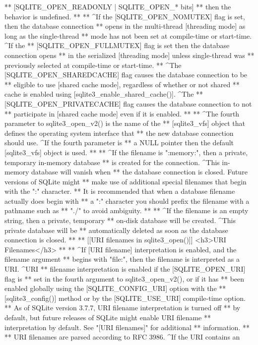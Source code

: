 \begin{Codex}[label=sqlite3.h,numbers=left]
{** [SQLITE_OPEN_READONLY | SQLITE_OPEN_* bits]
** then the behavior is undefined.
**
** ^If the [SQLITE_OPEN_NOMUTEX] flag is set, then the database connection
** opens in the multi-thread [threading mode] as long as the single-thread
** mode has not been set at compile-time or start-time.  ^If the
** [SQLITE_OPEN_FULLMUTEX] flag is set then the database connection opens
** in the serialized [threading mode] unless single-thread was
** previously selected at compile-time or start-time.
** ^The [SQLITE_OPEN_SHAREDCACHE] flag causes the database connection to be
** eligible to use [shared cache mode], regardless of whether or not shared
** cache is enabled using [sqlite3_enable_shared_cache()].  ^The
** [SQLITE_OPEN_PRIVATECACHE] flag causes the database connection to not
** participate in [shared cache mode] even if it is enabled.
**
** ^The fourth parameter to sqlite3_open_v2() is the name of the
** [sqlite3_vfs] object that defines the operating system interface that
** the new database connection should use.  ^If the fourth parameter is
** a NULL pointer then the default [sqlite3_vfs] object is used.
**
** ^If the filename is ":memory:", then a private, temporary in-memory database
** is created for the connection.  ^This in-memory database will vanish when
** the database connection is closed.  Future versions of SQLite might
** make use of additional special filenames that begin with the ":" character.
** It is recommended that when a database filename actually does begin with
** a ":" character you should prefix the filename with a pathname such as
** "./" to avoid ambiguity.
**
** ^If the filename is an empty string, then a private, temporary
** on-disk database will be created.  ^This private database will be
** automatically deleted as soon as the database connection is closed.
**
** [[URI filenames in sqlite3_open()]] <h3>URI Filenames</h3>
**
** ^If [URI filename] interpretation is enabled, and the filename argument
** begins with "file:", then the filename is interpreted as a URI. ^URI
** filename interpretation is enabled if the [SQLITE_OPEN_URI] flag is
** set in the fourth argument to sqlite3_open_v2(), or if it has
** been enabled globally using the [SQLITE_CONFIG_URI] option with the
** [sqlite3_config()] method or by the [SQLITE_USE_URI] compile-time option.
** As of SQLite version 3.7.7, URI filename interpretation is turned off
** by default, but future releases of SQLite might enable URI filename
** interpretation by default.  See "[URI filenames]" for additional
** information.
**
** URI filenames are parsed according to RFC 3986. ^If the URI contains an
}
\end{Codex}
